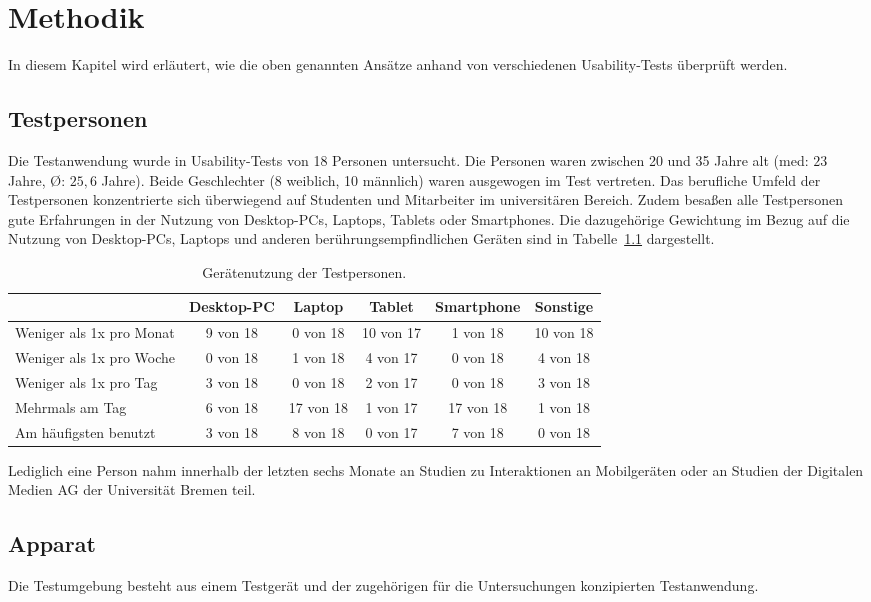 \documentclass[12pt,numbers=noenddot,parskip,bibliography=totocnumbered,listof=totocnumbered]{scrreprt}
\begin{document}
\chapter{Methodik}
In diesem Kapitel wird erläutert, wie die oben genannten Ansätze anhand von verschiedenen Usability-Tests überprüft werden.

\section{Testpersonen}
Die Testanwendung wurde in Usability-Tests von 18 Personen untersucht. Die Personen waren zwischen 20 und 35 Jahre alt (med: $23$ Jahre, \O: $25{,}6$ Jahre). Beide Geschlechter (8 weiblich, 10 männlich) waren ausgewogen im Test vertreten. Das berufliche Umfeld der Testpersonen konzentrierte sich überwiegend auf Studenten und Mitarbeiter im universitären Bereich. Zudem besaßen alle Testpersonen gute Erfahrungen in der Nutzung von Desktop-PCs, Laptops, Tablets oder Smartphones. Die dazugehörige Gewichtung im Bezug auf die Nutzung von Desktop-PCs, Laptops und anderen berührungsempfindlichen Geräten sind in Tabelle~\ref{nutzungtestpersonen} dargestellt.
\begin{table}
\centering
\renewcommand{\arraystretch}{2}
\setlength{\tabcolsep}{2.2pt}
\begin{tabular}{ p{4.8cm} | c c c c c}
& Desktop-PC & Laptop & Tablet & Smartphone & Sonstige\\\hline
Weniger als 1x pro Monat & 9 von 18 & 0 von 18 & 10 von 17 & 1 von 18 & 10 von 18 \\
Weniger als 1x pro Woche & 0 von 18 & 1 von 18 & 4 von 17 & 0 von 18 & 4 von 18 \\
Weniger als 1x pro Tag & 3 von 18 & 0 von 18 & 2 von 17 & 0 von 18 & 3 von 18 \\
Mehrmals am Tag & 6 von 18 & 17 von 18 & 1 von 17 & 17 von 18 & 1 von 18 \\
\hline
Am häufigsten benutzt & 3 von 18 & 8 von 18 & 0 von 17 & 7 von 18 & 0 von 18 \\
\end{tabular}
\caption{Gerätenutzung der Testpersonen.}
\label{nutzungtestpersonen}
\end{table}
Lediglich eine Person nahm innerhalb der letzten sechs Monate an Studien zu Interaktionen an Mobilgeräten oder an Studien der Digitalen Medien AG der Universität Bremen teil.

\section{Apparat}
Die Testumgebung besteht aus einem Testgerät und der zugehörigen für die Untersuchungen konzipierten Testanwendung.
\end{document}
